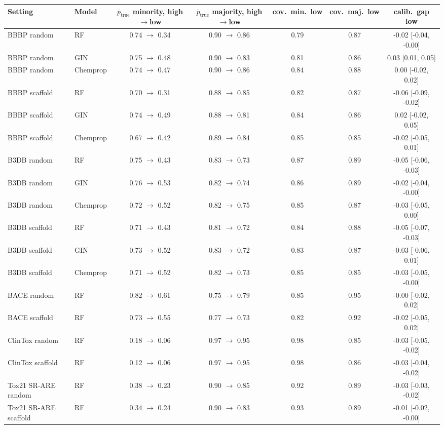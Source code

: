 \begin{tabular}{llccccc}
\toprule
Setting & Model & $\bar p_{\mathrm{true}}$ minority, high$\to$low & $\bar p_{\mathrm{true}}$ majority, high$\to$low & cov.\ min.\ low & cov.\ maj.\ low & calib.\ gap low\\
\midrule
BBBP random & RF & 0.74 $\to$ 0.34 & 0.90 $\to$ 0.86 & 0.79 & 0.87 & -0.02 [-0.04, -0.00]\\
BBBP random & GIN & 0.75 $\to$ 0.48 & 0.90 $\to$ 0.83 & 0.81 & 0.86 & 0.03 [0.01, 0.05]\\
BBBP random & Chemprop & 0.74 $\to$ 0.47 & 0.90 $\to$ 0.86 & 0.84 & 0.88 & 0.00 [-0.02, 0.02]\\
BBBP scaffold & RF & 0.70 $\to$ 0.31 & 0.88 $\to$ 0.85 & 0.82 & 0.87 & -0.06 [-0.09, -0.02]\\
BBBP scaffold & GIN & 0.74 $\to$ 0.49 & 0.88 $\to$ 0.81 & 0.84 & 0.86 & 0.02 [-0.02, 0.05]\\
BBBP scaffold & Chemprop & 0.67 $\to$ 0.42 & 0.89 $\to$ 0.84 & 0.85 & 0.85 & -0.02 [-0.05, 0.01]\\
B3DB random & RF & 0.75 $\to$ 0.43 & 0.83 $\to$ 0.73 & 0.87 & 0.89 & -0.05 [-0.06, -0.03]\\
B3DB random & GIN & 0.76 $\to$ 0.53 & 0.82 $\to$ 0.74 & 0.86 & 0.89 & -0.02 [-0.04, -0.00]\\
B3DB random & Chemprop & 0.72 $\to$ 0.52 & 0.82 $\to$ 0.75 & 0.85 & 0.87 & -0.03 [-0.05, 0.00]\\
B3DB scaffold & RF & 0.71 $\to$ 0.43 & 0.81 $\to$ 0.72 & 0.84 & 0.88 & -0.05 [-0.07, -0.03]\\
B3DB scaffold & GIN & 0.73 $\to$ 0.52 & 0.83 $\to$ 0.72 & 0.83 & 0.87 & -0.03 [-0.06, 0.01]\\
B3DB scaffold & Chemprop & 0.71 $\to$ 0.52 & 0.82 $\to$ 0.73 & 0.85 & 0.85 & -0.03 [-0.05, -0.00]\\
\midrule
BACE random & RF & 0.82 $\to$ 0.61 & 0.75 $\to$ 0.79 & 0.85 & 0.95 & -0.00 [-0.02, 0.02]\\
BACE scaffold & RF & 0.73 $\to$ 0.55 & 0.77 $\to$ 0.73 & 0.82 & 0.92 & -0.02 [-0.05, 0.02]\\
ClinTox random & RF & 0.18 $\to$ 0.06 & 0.97 $\to$ 0.95 & 0.98 & 0.85 & -0.03 [-0.05, -0.02]\\
ClinTox scaffold & RF & 0.12 $\to$ 0.06 & 0.97 $\to$ 0.95 & 0.98 & 0.86 & -0.03 [-0.04, -0.02]\\
Tox21 SR-ARE random & RF & 0.38 $\to$ 0.23 & 0.90 $\to$ 0.85 & 0.92 & 0.89 & -0.03 [-0.03, -0.02]\\
Tox21 SR-ARE scaffold & RF & 0.34 $\to$ 0.24 & 0.90 $\to$ 0.83 & 0.93 & 0.89 & -0.01 [-0.02, -0.00]\\
\bottomrule
\end{tabular}
